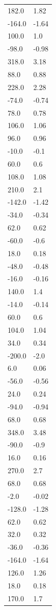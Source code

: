 \begin{longtable}{ll}
182.0 & 1.82 \\
-164.0 & -1.64 \\
100.0 & 1.0 \\
-98.0 & -0.98 \\
318.0 & 3.18 \\
88.0 & 0.88 \\
228.0 & 2.28 \\
-74.0 & -0.74 \\
78.0 & 0.78 \\
106.0 & 1.06 \\
96.0 & 0.96 \\
-10.0 & -0.1 \\
60.0 & 0.6 \\
108.0 & 1.08 \\
210.0 & 2.1 \\
-142.0 & -1.42 \\
-34.0 & -0.34 \\
62.0 & 0.62 \\
-60.0 & -0.6 \\
18.0 & 0.18 \\
-48.0 & -0.48 \\
-16.0 & -0.16 \\
140.0 & 1.4 \\
-14.0 & -0.14 \\
60.0 & 0.6 \\
104.0 & 1.04 \\
34.0 & 0.34 \\
-200.0 & -2.0 \\
6.0 & 0.06 \\
-56.0 & -0.56 \\
24.0 & 0.24 \\
-94.0 & -0.94 \\
68.0 & 0.68 \\
348.0 & 3.48 \\
-90.0 & -0.9 \\
16.0 & 0.16 \\
270.0 & 2.7 \\
68.0 & 0.68 \\
-2.0 & -0.02 \\
-128.0 & -1.28 \\
62.0 & 0.62 \\
32.0 & 0.32 \\
-36.0 & -0.36 \\
-164.0 & -1.64 \\
126.0 & 1.26 \\
18.0 & 0.18 \\
170.0 & 1.7 \\

\end{longtable}
